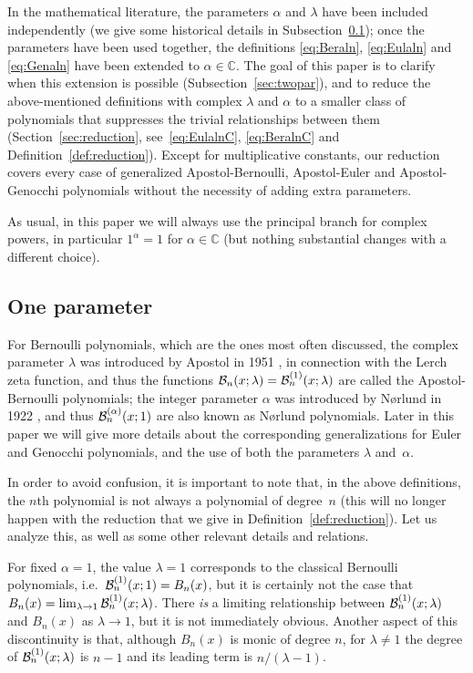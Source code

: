 \documentclass[11pt,a4paper]{amsart}
\newcommand{\C}{\mathbb{C}}
\newcommand{\B}[1][]{\mathcal{B}\ifx#1\empty\else^{(#1)}\fi}
\theoremstyle{plain}
\theoremstyle{plain}
\theoremstyle{plain}
\begin{document}
In the mathematical literature, 
the parameters $\alpha$ and $\lambda$ have been included independently (we give some historical details in Subsection~\ref{sec:onepar}); once the parameters have been used together, the definitions \eqref{eq:Beraln}, \eqref{eq:Eulaln} and \eqref{eq:Genaln} 
have been extended to $\alpha \in \C$. The goal of this paper is to clarify when this extension is possible (Subsection~\ref{sec:twopar}), and to reduce the above-mentioned definitions with complex $\lambda$ and $\alpha$ to a smaller class of polynomials that suppresses the trivial relationships between them (Section~\ref{sec:reduction}, see~\eqref{eq:EulalnC}, \eqref{eq:BeralnC} and Definition~\ref{def:reduction}).
Except for multiplicative constants, our reduction covers every case of generalized Apostol-Bernoulli, Apostol-Euler and Apostol-Genocchi polynomials without the necessity of adding extra parameters.

As usual, in this paper we will always use the principal branch for complex powers, in particular $1^\alpha = 1$ for $\alpha \in \C$ 
(but nothing substantial changes with a different choice).

\subsection{One parameter} %
\label{sec:onepar}

For Bernoulli polynomials, which are the ones most often discussed, the complex parameter $\lambda$ was introduced by Apostol in 1951 \cite{Ap}, in connection with the Lerch zeta function, and thus the functions $\B_{n}(x;\lambda) = \B[1]_{n}(x;\lambda)$ are called the Apostol-Bernoulli polynomials; the integer parameter $\alpha$ was introduced by N{\o}rlund in 1922 \cite{Nor}, and thus $\B[\alpha]_{n}(x;1)$ are also known as N{\o}rlund polynomials.
Later in this paper we will give more details about the corresponding generalizations for Euler and Genocchi polynomials, 
and the use of both the parameters $\lambda$ and~$\alpha$.

In order to avoid confusion, it is important to note that, in the above definitions, the $n$th polynomial is not always a polynomial of degree~$n$ (this will no longer happen with the reduction that we give in Definition~\ref{def:reduction}). Let us analyze this, as well as some other relevant details and relations.

For fixed $\alpha=1$, the value $\lambda = 1$ corresponds to the classical Bernoulli polynomials, i.e.\ $\B[1]_{n}(x;1) = B_n(x)$, but it is certainly not the case that $B_{n}(x) = \lim_{\lambda \to 1}\B[1]_{n}(x;\lambda)$.
There \emph{is} a limiting relationship between $\B[1]_{n}(x;\lambda)$ and $B_{n}(x)$ as $\lambda \to 1$, but it is not immediately obvious. Another aspect of this discontinuity is that, although $B_{n}(x)$ is monic of degree $n$, for $\lambda \neq 1$ the degree of $\B[1]_{n}(x;\lambda)$ is $n-1$ and its leading term is $n/(\lambda-1)$.
\end{document}
